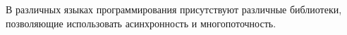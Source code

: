 \documentclass[a4paper]{article}
\begin{document}
\begin{itemize}
			\end{itemize}
			В различных языках программирования присутствуют различные библиотеки, позволяющие использовать асинхронность и многопоточность.
			
\end{document}
